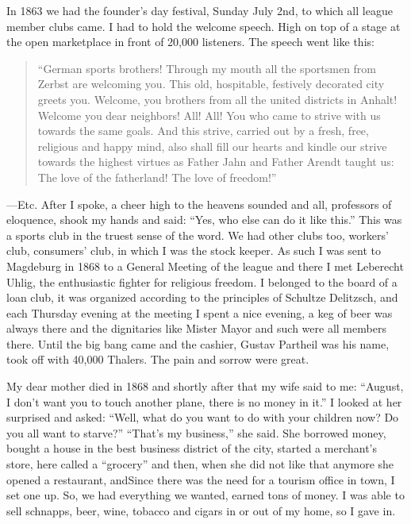In 1863 we had the founder's day festival, Sunday July 2nd, to which all league member clubs came. I had to hold the welcome speech. High on top of a stage at the open marketplace in front of 20,000 listeners. The speech went like this:

\begin{quote}
``German sports brothers! Through my mouth all the sportsmen from Zerbst are welcoming you. This old, hospitable, festively decorated city greets you. Welcome, you brothers from all the united districts in Anhalt! Welcome you dear neighbors! All! All! You who came to strive with us towards the same goals. And this strive, carried out by a fresh, free, religious and happy mind, also shall fill our hearts and kindle our strive towards the highest virtues as Father Jahn and Father Arendt taught us: The love of the fatherland! The love of freedom!''
\end{quote}

---Etc. After I spoke, a cheer high to the heavens sounded and all, professors of eloquence, shook my hands and said: ``Yes, who else can do it like this.'' This was a sports club in the truest sense of the word. We had other clubs too, workers' club, consumers' club, in which I was the stock keeper. As such I was sent to Magdeburg in 1868 to a General Meeting of the league and there I met Leberecht Uhlig, the enthusiastic fighter for religious freedom. I belonged to the board of a loan club, it was organized according to the principles of Schultze Delitzsch, and each Thursday evening at the meeting I spent a nice evening, a keg of beer was always there and the dignitaries like Mister Mayor and such were all members there. Until the big bang came and the cashier, Gustav Partheil was his name, took off with 40,000 Thalers. The pain and sorrow were great.

My dear mother died in 1868 and shortly after that my wife said to me: ``August, I don't want you to touch another plane, there is no money in it.'' I looked at her surprised and asked: ``Well, what do you want to do with your children now? Do you all want to starve?'' ``That's my business,'' she said. She borrowed money, bought a house in the best business district of the city, started a merchant's store, here called a ``grocery'' and then, when she did not like that anymore she opened a restaurant, andSince there was the need for a tourism office in town, I set one up. So, we had everything we wanted, earned tons of money. I was able to sell schnapps, beer, wine, tobacco and cigars in or out of my home, so I gave in.

